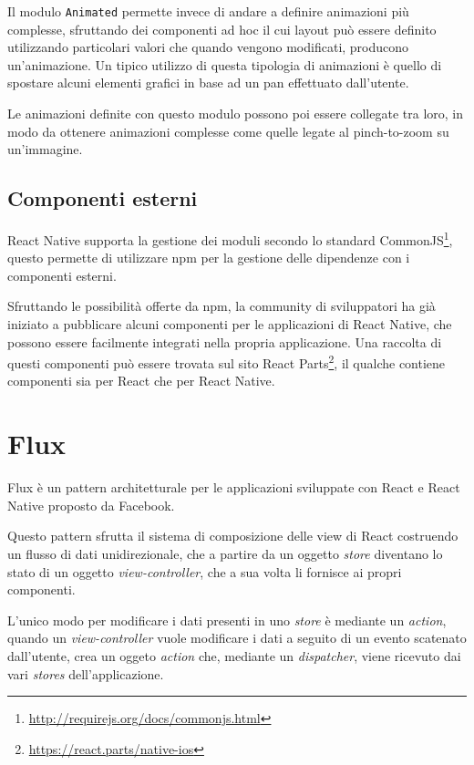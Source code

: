 Il modulo \texttt{Animated} permette invece di andare a definire animazioni più complesse, sfruttando dei componenti ad hoc il cui layout può essere definito utilizzando particolari valori che quando vengono modificati, producono un'animazione.
Un tipico utilizzo di questa tipologia di animazioni è quello di spostare alcuni elementi grafici in base ad un pan effettuato dall'utente.

Le animazioni definite con questo modulo possono poi essere collegate tra loro, in modo da ottenere animazioni complesse come quelle legate al pinch-to-zoom su un'immagine.

\subsection{Componenti esterni}

React Native supporta la gestione dei moduli secondo lo standard CommonJS\footnote{\url{http://requirejs.org/docs/commonjs.html}}, questo permette di utilizzare npm per la gestione delle dipendenze con i componenti esterni.

Sfruttando le possibilità offerte da npm, la community di sviluppatori ha già iniziato a pubblicare alcuni componenti per le applicazioni di React Native, che possono essere facilmente integrati nella propria applicazione.
Una raccolta di questi componenti può essere trovata sul sito React Parts\footnote{\url{https://react.parts/native-ios}}, il qualche contiene componenti sia per React che per React Native.

\section{Flux}\label{sec:flux}
Flux è un pattern architetturale per le applicazioni sviluppate con React e React Native proposto da Facebook.

Questo pattern sfrutta il sistema di composizione delle view di React costruendo un flusso di dati unidirezionale, che a partire da un oggetto \textit{store} diventano lo stato di un oggetto \textit{view-controller}, che a sua volta li fornisce ai propri componenti.

L'unico modo per modificare i dati presenti in uno \textit{store} è mediante un \textit{action}, quando un \textit{view-controller} vuole modificare i dati a seguito di un evento scatenato dall'utente, crea un oggeto \textit{action} che, mediante un \textit{dispatcher}, viene ricevuto dai vari \textit{stores} dell'applicazione.

